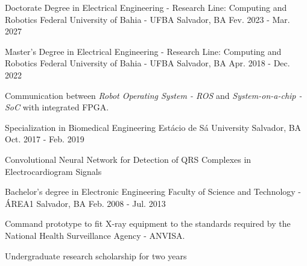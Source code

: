 

\begin{cventries}

  \cventry
    {Doctorate Degree in Electrical Engineering - Research Line: Computing and Robotics} %
    {Federal University of Bahia - UFBA} %
    {Salvador, BA} %
    {Fev. 2023 - Mar. 2027} %
    {
    }


  \cventry
    {Master's Degree in Electrical Engineering - Research Line: Computing and Robotics} %
    {Federal University of Bahia - UFBA} %
    {Salvador, BA} %
    {Apr. 2018 - Dec. 2022} %
    {
      \begin{cvitems} %
        \item {Communication between \textit{Robot Operating System - ROS} and \textit{System-on-a-chip - SoC} with integrated FPGA.}
      \end{cvitems}
    }


  \cventry
    {Specialization in Biomedical Engineering} %
    {Estácio de Sá University} %
    {Salvador, BA} %
    {Oct. 2017 - Feb. 2019} %
    {
      \begin{cvitems} %
        \item {Convolutional Neural Network for Detection of QRS Complexes in Electrocardiogram Signals}
      \end{cvitems}
    }


  \cventry
    {Bachelor's degree in Electronic Engineering} %
    {Faculty of Science and Technology - ÁREA1} %
    {Salvador, BA} %
    {Feb. 2008 - Jul. 2013} %
    {
      \begin{cvitems} %
        \item {Command prototype to fit X-ray equipment to the standards required by the National Health Surveillance Agency - ANVISA.}
        \item {Undergraduate research scholarship for two years}
      \end{cvitems}
    }

\end{cventries}
